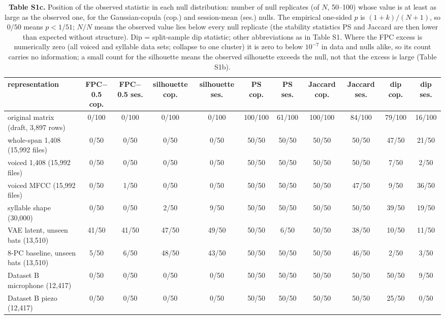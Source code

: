 \begin{table}[htbp]\centering\scriptsize
\caption{\textbf{Table S1c.} Position of the observed statistic in each null distribution: number of null replicates (of $N$, 50--100) whose value is at least as large as the observed one, for the Gaussian-copula (cop.) and session-mean (ses.) nulls. The empirical one-sided $p$ is $(1+k)/(N+1)$, so $0/50$ means $p<1/51$; $N/N$ means the observed value lies below every null replicate (the stability statistics PS and Jaccard are then lower than expected without structure). Dip = split-sample dip statistic; other abbreviations as in Table S1. Where the FPC excess is numerically zero (all voiced and syllable data sets; collapse to one cluster) it is zero to below $10^{-7}$ in data and nulls alike, so its count carries no information; a small count for the silhouette means the observed silhouette exceeds the null, not that the excess is large (Table S1b).}\label{tab:S1c}
\begin{adjustbox}{max width=\linewidth}
\begin{tabular}{lcccccccccc}
\toprule
representation & FPC$-$0.5 cop. & FPC$-$0.5 ses. & silhouette cop. & silhouette ses. & PS cop. & PS ses. & Jaccard cop. & Jaccard ses. & dip cop. & dip ses. \\
\midrule
original matrix (draft, 3,897 rows) & 0/100 & 0/100 & 0/100 & 0/100 & 100/100 & 61/100 & 100/100 & 84/100 & 79/100 & 16/100 \\
whole-span 1,408 (15,992 files) & 0/50 & 0/50 & 0/50 & 0/50 & 50/50 & 50/50 & 50/50 & 50/50 & 47/50 & 21/50 \\
voiced 1,408 (15,992 files) & 0/50 & 0/50 & 0/50 & 0/50 & 50/50 & 50/50 & 50/50 & 50/50 & 7/50 & 2/50 \\
voiced MFCC (15,992 files) & 0/50 & 1/50 & 0/50 & 0/50 & 50/50 & 50/50 & 50/50 & 47/50 & 9/50 & 36/50 \\
syllable shape (30,000) & 0/50 & 0/50 & 2/50 & 9/50 & 50/50 & 50/50 & 50/50 & 50/50 & 39/50 & 19/50 \\
VAE latent, unseen bats (13,510) & 41/50 & 41/50 & 47/50 & 49/50 & 50/50 & 6/50 & 50/50 & 38/50 & 10/50 & 11/50 \\
8-PC baseline, unseen bats (13,510) & 5/50 & 6/50 & 48/50 & 43/50 & 50/50 & 50/50 & 50/50 & 46/50 & 2/50 & 3/50 \\
Dataset B microphone (12,417) & 0/50 & 0/50 & 0/50 & 0/50 & 50/50 & 50/50 & 50/50 & 50/50 & 50/50 & 9/50 \\
Dataset B piezo (12,417) & 0/50 & 0/50 & 0/50 & 0/50 & 50/50 & 50/50 & 50/50 & 50/50 & 25/50 & 0/50 \\
\bottomrule
\end{tabular}
\end{adjustbox}
\end{table}
